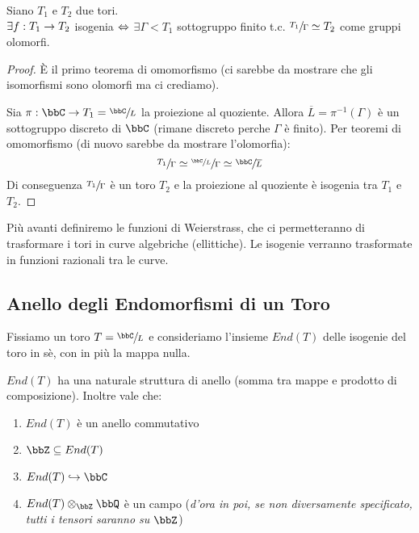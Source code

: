     \begin{proposizione}
    Siano $T_{1}$ e $T_{2}$ due tori.\\
    $\exists f:T_{1} \rightarrow T_{2}$ isogenia $\Leftrightarrow$ $\exists \Gamma < T_{1}$ sottogruppo finito t.c. $\sfrac{T_{1}}{\Gamma} \simeq T_{2}$ come gruppi olomorfi.
    \end{proposizione}
    \begin{proof}
      \fbox{$\Rar$} È il primo teorema di omomorfismo (ci sarebbe da mostrare che gli isomorfismi sono olomorfi ma ci crediamo).

      \fbox{$\Leftarrow$} Sia $\pi:\bbC \rar T_{1} = \sfrac{\bbC}{L}$ la proiezione al quoziente. Allora $\overline{L}=\pi^{-1}(\Gamma)$ è un sottogruppo discreto di $\bbC$ (rimane discreto perche $\Gamma$ è finito). Per teoremi di omomorfismo (di nuovo sarebbe da mostrare l'olomorfia):
    $$\sfrac{T_{1}}{\Gamma} \simeq \sfrac{\sfrac{\bbC}{L}}{\Gamma} \simeq \sfrac{\bbC}{\overline{L}}$$
    Di conseguenza $\sfrac{T_{1}}{\Gamma}$ è un toro $T_{2}$ e la proiezione al quoziente è isogenia tra $T_{1}$ e $T_{2}$.
    \end{proof}

    Più avanti definiremo le funzioni di Weierstrass, che ci permetteranno di trasformare i tori in curve algebriche (ellittiche). Le isogenie verranno trasformate in funzioni razionali tra le curve.

\subsection{Anello degli Endomorfismi di un Toro}

    Fissiamo un toro $T=\sfrac{\bbC}{L}$ e consideriamo l'insieme $End(T)$ delle isogenie del toro in sè, con in più la mappa nulla.

    \begin{proposizione} $End(T)$ ha una naturale struttura di anello (somma tra mappe e prodotto di composizione). Inoltre vale che:
    \begin{enumerate}
    \item $End(T)$ è un anello commutativo
    \item $\bbZ \subseteq End(T)$
    \item $End(T) \hookrightarrow \bbC$
    \item $End(T) \otimes_{\bbZ} \bbQ$ è un campo ({\it d'ora in poi, se non diversamente specificato, tutti i tensori saranno su $\bbZ$})
    \end{enumerate}
    \end{proposizione}

